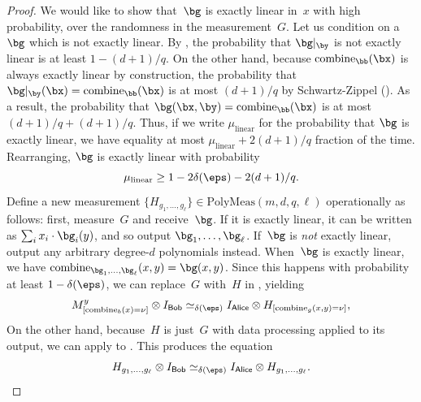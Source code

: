 \documentclass[11pt]{article}
\newcommand{\consistency}{\simeq}
\newcommand{\simulpolymeas}[4]{\mathrm{PolyMeas}(#1,#2,#3, #4)}
\newcommand{\reg}[1]{{\mathsf{#1}}}
\begin{document}
\begin{proof}
We would like to show that~$\bg$ is exactly linear in~$x$ with high probability, over the randomness in the measurement~$G$.
Let us condition on a $\bg$ which is not exactly linear.
By , the probability that $\bg|_{\by}$ is not exactly linear is at least $1-(d+1)/q$.
On the other hand, because $\mathrm{combine}_{\bb}(\bx)$ is always exactly linear by construction,
the probability that $\bg|_{\by}(\bx) = \mathrm{combine}_{\bb}(\bx)$ is at most $(d+1)/q$ by Schwartz-Zippel ().
As a result, the probability that $\bg(\bx, \by) = \mathrm{combine}_{\bb}(\bx)$ is at most $(d+1)/q + (d+1)/q$.
Thus, if we write $\mu_{\mathrm{linear}}$ for the probability that $\bg$ is exactly linear, we have equality at most $\mu_{\mathrm{linear}} + 2(d+1)/q$ fraction of the time.
Rearranging, $\bg$ is exactly linear with probability
\begin{equation*}
\mu_{\mathrm{linear}} \geq 1 - 2\delta(\eps) - 2(d+1)/q.
\end{equation*}
Define a new measurement $\{H_{g_1, \ldots, g_\ell}\} \in \simulpolymeas{m}{d}{q}{\ell}$ operationally as follows: first, measure~$G$ and receive~$\bg$.
If it is exactly linear, it can be written as $\sum_i x_i \cdot \bg_i(y)$, and so output $\bg_1, \ldots, \bg_\ell$.
If~$\bg$ is \emph{not} exactly linear, output any arbitrary degree-$d$ polynomials instead.
When~$\bg$ is exactly linear, we have $\mathrm{combine}_{\bg_1, \ldots, \bg_\ell}(x, y) = \bg(x, y)$.
Since this happens with probability at least $1-\delta(\eps)$,
we can replace~$G$ with~$H$ in , yielding
\begin{equation}\label{eq:no-name-is-a-bad-name}
M^y_{[\mathrm{combine}_b(x)=\nu]} \otimes I_{\reg{Bob}}
\consistency_{\delta(\eps)} I_{\reg{Alice}} \otimes H_{[\mathrm{combine}_g(x, y) = \nu]},
\end{equation}
On the other hand, because~$H$ is just~$G$ with data processing applied to its output,
we can apply  to . This produces the equation
\begin{equation*}
H_{g_1, \ldots, g_\ell} \otimes I_{\reg{Bob}} \consistency_{\delta(\eps)} I_{\reg{Alice}} \otimes H_{g_1, \ldots, g_\ell}.
\end{equation*}


\end{proof}
\end{document}
